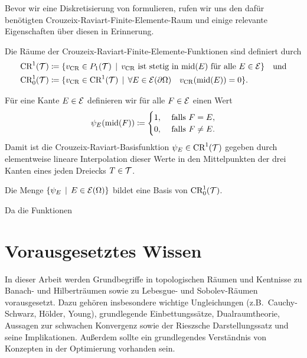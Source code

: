 Bevor wir eine Diskretisierung von  formulieren,
rufen wir uns den dafür benötigten
Crou\-zeix\--Ra\-vi\-art\--Fi\-ni\-te-Ele\-men\-te-Raum und
einige relevante Eigenschaften über diesen in Erinnerung.

Die Räume der Crouzeix-Raviart-Finite-Elemente-Funktionen sind definiert durch
\begin{align*}
  \textup{CR}^1(\mathcal{T})
  &\coloneqq
  \{v_\textup{CR}\in P_1(\mathcal{T})\,\mid\, v_\textup{CR} \text{ ist stetig in }\textup{mid}(E)\text{ für
  alle } E\in\mathcal{E}\} \quad\text{und}\\
  \textup{CR}^1_0(\mathcal{T})
  &\coloneqq
  \{v_\textup{CR}\in\textup{CR}^1(\mathcal{T})\,\mid\, \forall E\in\mathcal{E}(\partial\Omega)\quad
  v_\textup{CR}(\textup{mid}(E))=0\}.
\end{align*}

Für eine Kante $E\in\mathcal{E}$ definieren wir für alle $F\in\mathcal{E}$ einen Wert
\begin{align*}
  \psi_E(\textup{mid}(F))
  \coloneqq
  \begin{cases}
    1,&\text{ falls } F=E,\\
    0,&\text{ falls } F\neq E.
  \end{cases}
\end{align*}
Damit ist die Crouzeix-Raviart-Basisfunktion $\psi_E\in\textup{CR}^1(\mathcal{T})$
gegeben durch elementweise lineare Interpolation dieser Werte in den
Mittelpunkten der drei Kanten eines jeden Dreiecks $T\in\mathcal{T}$.

Die Menge $\{\psi_E\,\mid\,E\in\mathcal{E}(\Omega)\}$ bildet eine Basis von
$\textup{CR}^1_0(\mathcal{T})$.

Da die Funktionen 

\section{Vorausgesetztes Wissen}
\label{sec:basicKnowledge}

In dieser Arbeit werden Grundbegriffe in topologischen Räumen und Kentnisse zu
Banach- und Hilberträumen sowie zu Lebesgue- und Sobolev-Räumen vorausgesetzt.
Dazu gehören insbesondere wichtige Ungleichungen (z.B.\ Cauchy-Schwarz, Hölder,
Young), grundlegende Einbettungssätze, Dualraumtheorie, Aussagen zur schwachen
Konvergenz sowie der Rieszsche Darstellungssatz und seine Implikationen.
Außerdem sollte ein grundlegendes Verständnis von Konzepten in der Optimierung
vorhanden sein.

